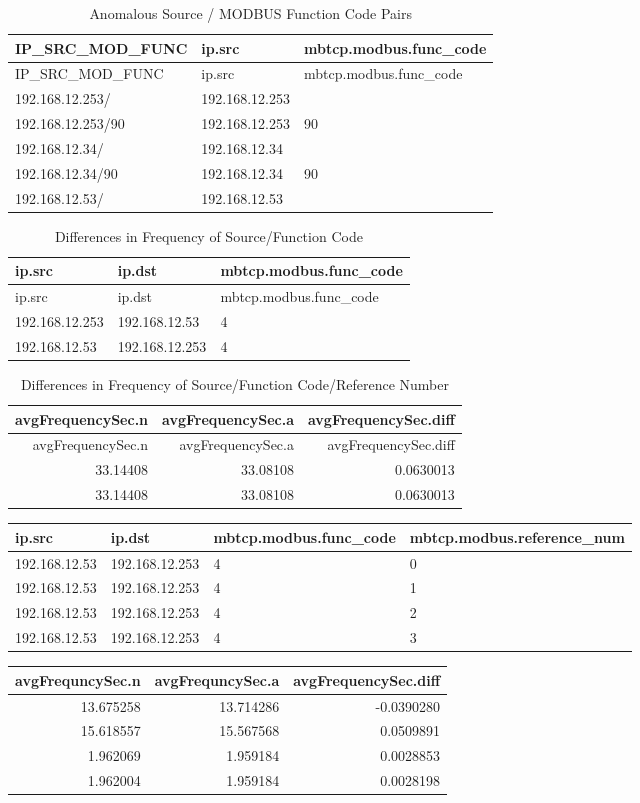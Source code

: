 \documentclass[11pt,]{article}
\begin{document}
\begin{longtable}[c]{@{}lll@{}}
\caption{Anomalous Source / MODBUS Function Code Pairs}\tabularnewline
\toprule
IP\_SRC\_MOD\_FUNC & ip.src & mbtcp.modbus.func\_code\tabularnewline
\midrule
\endfirsthead
\toprule
IP\_SRC\_MOD\_FUNC & ip.src & mbtcp.modbus.func\_code\tabularnewline
\midrule
\endhead
192.168.12.253/ & 192.168.12.253 &\tabularnewline
192.168.12.253/90 & 192.168.12.253 & 90\tabularnewline
192.168.12.34/ & 192.168.12.34 &\tabularnewline
192.168.12.34/90 & 192.168.12.34 & 90\tabularnewline
192.168.12.53/ & 192.168.12.53 &\tabularnewline
\bottomrule
\end{longtable}

\begin{longtable}[c]{@{}lll@{}}
\caption{Differences in Frequency of Source/Function
Code}\tabularnewline
\toprule
ip.src & ip.dst & mbtcp.modbus.func\_code\tabularnewline
\midrule
\endfirsthead
\toprule
ip.src & ip.dst & mbtcp.modbus.func\_code\tabularnewline
\midrule
\endhead
192.168.12.253 & 192.168.12.53 & 4\tabularnewline
192.168.12.53 & 192.168.12.253 & 4\tabularnewline
\bottomrule
\end{longtable}

\begin{longtable}[c]{@{}rrr@{}}
\caption{Differences in Frequency of Source/Function Code/Reference
Number}\tabularnewline
\toprule
avgFrequencySec.n & avgFrequencySec.a &
avgFrequencySec.diff\tabularnewline
\midrule
\endfirsthead
\toprule
avgFrequencySec.n & avgFrequencySec.a &
avgFrequencySec.diff\tabularnewline
\midrule
\endhead
33.14408 & 33.08108 & 0.0630013\tabularnewline
33.14408 & 33.08108 & 0.0630013\tabularnewline
\bottomrule
\end{longtable}

\begin{longtable}[c]{@{}llll@{}}
\toprule
ip.src & ip.dst & mbtcp.modbus.func\_code &
mbtcp.modbus.reference\_num\tabularnewline
\midrule
\endhead
192.168.12.53 & 192.168.12.253 & 4 & 0\tabularnewline
192.168.12.53 & 192.168.12.253 & 4 & 1\tabularnewline
192.168.12.53 & 192.168.12.253 & 4 & 2\tabularnewline
192.168.12.53 & 192.168.12.253 & 4 & 3\tabularnewline
\bottomrule
\end{longtable}

\begin{longtable}[c]{@{}rrr@{}}
\toprule
avgFrequncySec.n & avgFrequncySec.a &
avgFrequencySec.diff\tabularnewline
\midrule
\endhead
13.675258 & 13.714286 & -0.0390280\tabularnewline
15.618557 & 15.567568 & 0.0509891\tabularnewline
1.962069 & 1.959184 & 0.0028853\tabularnewline
1.962004 & 1.959184 & 0.0028198\tabularnewline
\bottomrule
\end{longtable}
\end{document}

